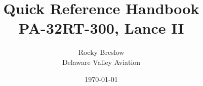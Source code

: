 \documentclass{article}
\title{
    Quick Reference Handbook
    \\
    PA-32RT-300, Lance II
}
\date{\today}
\author{
    Rocky Breslow
    \\
    Delaware Valley Aviation
}
\begin{document}
\lsstyle

\begin{titlepage}
    \maketitle
\end{titlepage}

\tableofcontents



\end{document}
